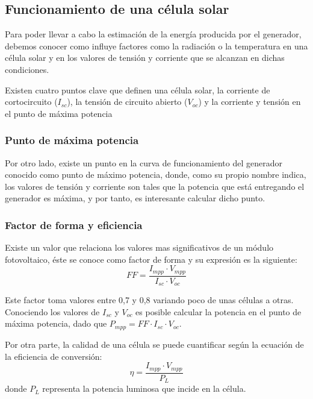 \subsection{Funcionamiento de una célula solar}

Para poder llevar a cabo la estimación de la energía producida por el generador, debemos conocer como influye factores como la radiación o la temperatura en una célula solar y en los valores de tensión y corriente que se alcanzan en dichas condiciones.

Existen cuatro puntos clave que definen una célula solar, la corriente de cortocircuito ($I_{sc}$), la tensión de circuito abierto ($V_{oc}$) y la corriente y tensión en el punto de máxima potencia

\subsubsection{Punto de máxima potencia}

Por otro lado, existe un punto en la curva de funcionamiento del generador conocido como punto de máximo potencia, donde, como su propio nombre indica, los valores de tensión y corriente son tales que la potencia que está entregando el generador es máxima, y por tanto, es interesante calcular dicho punto.

\subsubsection{Factor de forma y eficiencia}

Existe un valor que relaciona los valores mas significativos de un módulo fotovoltaico, éste se conoce como factor de forma y su expresión es la siguiente:
\begin{equation}
\label{eqn:FF}
FF = \frac{I_{mpp} \cdot V_{mpp}}{I_{sc} \cdot V_{oc}}
\end{equation}

Este factor toma valores entre 0,7 y 0,8 variando poco de unas células a otras. Conociendo los valores de $I_{sc}$ y $V_{oc}$ es posible calcular la potencia en el punto de máxima potencia, dado que $P_{mpp}=FF \cdot I_{sc} \cdot V_{oc}$.

Por otra parte, la calidad de una célula se puede cuantificar según la ecuación de la eficiencia de conversión:
\begin{equation}
\eta = \frac{I_{mpp} \cdot V_{mpp}}{P_L}
\end{equation}
donde $P_L$ representa la potencia luminosa que incide en la célula.

